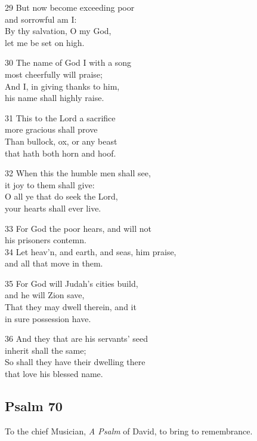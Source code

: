 29 But now become exceeding poor\\
and sorrowful am I:\\
By thy salvation, O my God,\\
let me be set on high.

30 The name of God I with a song\\
most cheerfully will praise;\\
And I, in giving thanks to him,\\
his name shall highly raise.

31 This to the Lord a sacrifice\\
more gracious shall prove\\
Than bullock, ox, or any beast\\
that hath both horn and hoof.

32 When this the humble men shall see,\\
it joy to them shall give:\\
O all ye that do seek the Lord,\\
your hearts shall ever live.

33 For God the poor hears, and will not\\
his prisoners contemn.\\
34 Let heav’n, and earth, and seas, him praise,\\
and all that move in them.

35 For God will Judah’s cities build,\\
and he will Zion save,\\
That they may dwell therein, and it\\
in sure possession have.

36 And they that are his servants’ seed\\
inherit shall the same;\\
So shall they have their dwelling there\\
that love his blessed name.

\begin{center}
\quad{}\quad{}
\end{center}

\subsection*{Psalm 70}

To the chief Musician,
\emph{A Psalm} of David, to bring to remembrance.

